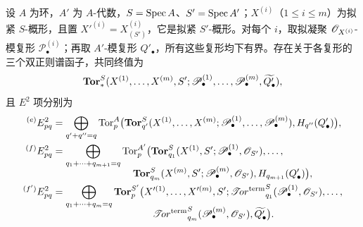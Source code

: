 设 $A$ 为环，$A'$ 为 $A$-代数，$S=\operatorname{Spec} A$、$S'=\operatorname{Spec} A'$；$X^{(i)}$（$1\leq i\leq m$）为拟紧 $S$-概形，且置 $X'^{(i)}=X^{(i)}_{(S')}$，它是拟紧 $S'$-概形。对每个 $i$，取拟凝聚 $\mathscr O_{X^{(i)}}$-模复形 $\mathscr P^{(i)}_\bullet$；再取 $A'$-模复形 $Q'_\bullet$，所有这些复形均下有界。存在关于各复形的三个双正则谱函子，共同终值为
\[
 \operatorname{\mathbf{Tor}}_*^S(X^{(1)},\ldots,X^{(m)},S';
         \mathscr P^{(1)}_\bullet,\ldots,\mathscr P^{(m)}_\bullet,\widetilde{Q'_\bullet}),
\]
且 $E^2$ 项分别为
\begin{align*}
 {}^{(e)}E^2_{pq}
 &=\bigoplus_{q'+q''=q}\Tor_p^A\bigl(
     \bTor_{q'}^S(X^{(1)},\ldots,X^{(m)};
          \mathscr P^{(1)}_\bullet,\ldots,\mathscr P^{(m)}_\bullet),H_{q''}(Q'_\bullet)\bigr),\\
 {}^{(f)}E^2_{pq}
 &=\bigoplus_{q_1+\cdots+q_{m+1}=q}\Tor_p^{A'}\bigl(
      \bTor_{q_1}^S(X^{(1)},S';\mathscr P^{(1)}_\bullet,\OO_{S'}),\ldots,\\[-.6em]
 &\hspace{8em}\bTor_{q_m}^S(X^{(m)},S';\mathscr P^{(m)}_\bullet,\OO_{S'}),
        H_{q_{m+1}}(Q'_\bullet)\bigr),\\
 {}^{(f')}E^2_{pq}
 &=\bigoplus_{q_1+\cdots+q_m=q}\bTor_p^{S'}\bigl(
   X'^{(1)},\ldots,X'^{(m)},S';
   \termTor_{q_1}^S(\mathscr P^{(1)}_\bullet,\OO_{S'}),\ldots,\\[-.6em]
 &\hspace{10em}\termTor_{q_m}^S(\mathscr P^{(m)}_\bullet,\OO_{S'}),
       \widetilde{Q'_\bullet}\bigr).
\end{align*}
